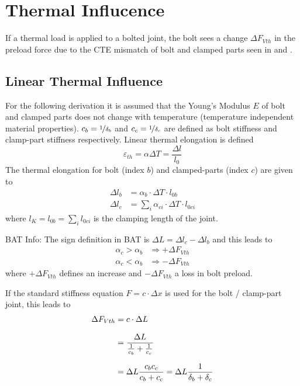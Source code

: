 \section{Thermal Influcence}
\label{sec:thermal}
If a thermal load is applied to a bolted joint, the bolt sees a change $\Delta F_{Vth}$ in the preload
force due to the CTE mismatch of bolt and clamped parts seen in  and .
\subsection{Linear Thermal Influence}
For the following derivation it is assumed that the Young's Modulus $E$ of bolt and clamped parts does 
not change with temperature (temperature independent material properties). $c_b=\nicefrac{1}{\delta_b}$
and $c_c=\nicefrac{1}{\delta_c}$ are defined as bolt stiffness and clamp-part stiffness respectively.
Linear thermal elongation is defined
\begin{equation*}
  \varepsilon_{th} = \alpha \Delta T = \frac{\Delta l}{l_0}
\end{equation*}
The thermal elongation for bolt (index $b$) and clamped-parts (index $c$) are given to
\begin{subequations}
  \begin{align*}
    \Delta l_b &= \alpha_b \cdot \Delta T \cdot l_{0b} \\
    \Delta l_c &= \sum_i \alpha_{ci} \cdot \Delta T \cdot l_{0ci}
  \end{align*}
\end{subequations}
where $l_K = l_{0b} = \sum_i l_{0ci}$ is the clamping length of the joint.
\begin{colbox}{BAT Info:}
  The sign definition in BAT is $\Delta L = \Delta l_c - \Delta l_b$ and this leads to 
  \begin{subequations}
    \begin{align*}
      \alpha_c > \alpha_b &\Rightarrow \pmb{+}\Delta F_{Vth} \\
      \alpha_c < \alpha_b &\Rightarrow \pmb{-}\Delta F_{Vth}
    \end{align*}
  \end{subequations}
  where $\pmb{+}\Delta F_{Vth}$ defines an increase and $\pmb{-}\Delta F_{Vth}$ a loss in bolt preload.
\end{colbox}
If the standard stiffness equation $F=c \cdot \Delta x$ is used for the bolt / clamp-part joint, this leads to
\begin{subequations}
  \setlength{\jot}{10pt}
  \begin{align}
    \Delta F_{Vth} &= c \cdot \Delta L \\
    &= \frac{\Delta L}{\frac{1}{c_b}+\frac{1}{c_c}} \\
    &= \Delta L \frac{c_b c_c}{c_b + c_c} = \Delta L \frac{1}{\delta_b + \delta_c}
    \label{equ:dFVth}
  \end{align}
\end{subequations}

